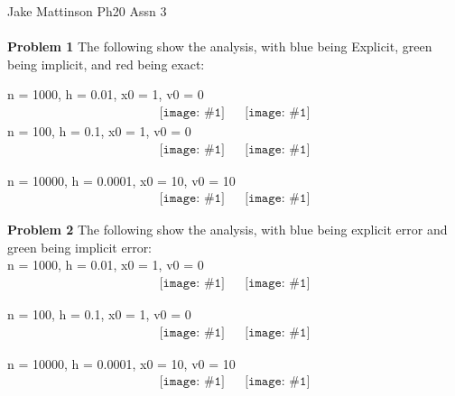\documentclass[a4paper,12pt]{article}
\newcommand{\insertPicture}[1]{\texttt{[image: \#1]}}
\begin{document}
Jake Mattinson \hfill Ph20 Assn 3\\ \\ 

\textbf{Problem 1}
The following show the analysis, with blue being Explicit, green being implicit, and red being exact:

n = 1000, h = 0.01, x0 = 1, v0 = 0\\
$$
\begin{matrix}
\insertPicture{x-1000-01-1-0} && \insertPicture{v-1000-01-1-0}
\end{matrix}
$$
n = 100, h = 0.1, x0 = 1, v0 = 0\\
$$
\begin{matrix}
\insertPicture{x-100-1-1-0} && \insertPicture{v-100-1-1-0}
\end{matrix}
$$

n = 10000, h = 0.0001, x0 = 10, v0 = 10\\
$$
\begin{matrix}
\insertPicture{x-10000-0001-10-10} && \insertPicture{v-10000-0001-10-10}
\end{matrix}
$$
\newpage

\textbf{Problem 2}
The following show the analysis, with blue being explicit error and green being implicit error:\\

n = 1000, h = 0.01, x0 = 1, v0 = 0\\
$$
\begin{matrix}
\insertPicture{ErrX-1000-01-1-0} && \insertPicture{ErrV-1000-01-1-0}
\end{matrix}
$$

n = 100, h = 0.1, x0 = 1, v0 = 0\\
$$
\begin{matrix}
\insertPicture{ErrX-100-1-1-0} && \insertPicture{ErrV-100-1-1-0}
\end{matrix}
$$

n = 10000, h = 0.0001, x0 = 10, v0 = 10\\
$$
\begin{matrix}
\insertPicture{ErrX-10000-0001-10-10} && \insertPicture{ErrV-10000-0001-10-10}
\end{matrix}
$$
\end{document}
